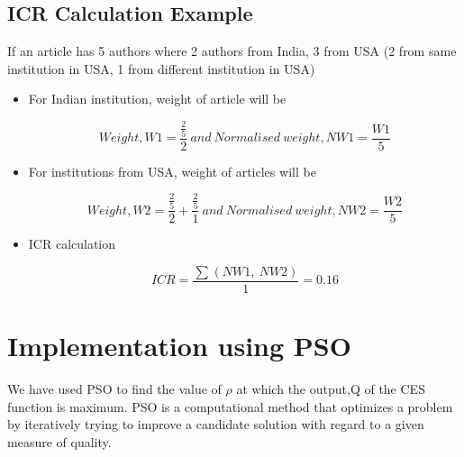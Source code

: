 \documentclass{article}
\begin{document}
\subsection{ICR Calculation Example}
\item If an article has 5 authors where 2 authors from India, 3 from USA (2 from same institution in USA, 1 from different institution in USA)
\begin{itemize}
        \item For Indian institution, weight of article will be
        
              \begin{center}
         \begin{equation*}
Weight, W1 = \frac{\frac{2}{5}}{2} \ and 
\ Normalised\ weight, NW1 = \frac{W1}{5}
\end{equation*}
    \end{center}
     \item For institutions from USA, weight of articles will be
        
              \begin{center}
         \begin{equation*}
Weight, W2 = \frac{\frac{2}{5}}{2} + \frac{\frac{2}{5}}{1} \ and 
\ Normalised\ weight, NW2 = \frac{W2}{5}
\end{equation*}
    \end{center}
    
\item ICR calculation
\begin{center}
         \begin{equation*}
ICR = \frac{\sum^{}(NW1,\ NW2)}{1} = 0.16
\end{equation*}
    \end{center}
\end{itemize}
       
       
\section{Implementation using PSO}
We have used PSO to find the value of $\rho$ at which the output,Q of the CES function is maximum. 
    PSO is a computational method that optimizes a problem by iteratively trying to improve a candidate solution with regard to a given measure of quality.
    
    
\end{document}

